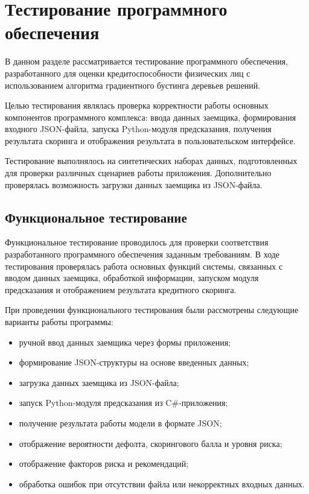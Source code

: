 \section{Тестирование программного обеспечения}

В данном разделе рассматривается тестирование программного обеспечения, разработанного для оценки кредитоспособности физических лиц с использованием алгоритма градиентного бустинга деревьев решений.

Целью тестирования являлась проверка корректности работы основных компонентов программного комплекса: ввода данных заемщика, формирования входного JSON-файла, запуска Python-модуля предсказания, получения результата скоринга и отображения результата в пользовательском интерфейсе.

Тестирование выполнялось на синтетических наборах данных, подготовленных для проверки различных сценариев работы приложения. Дополнительно проверялась возможность загрузки данных заемщика из JSON-файла.

\subsection{Функциональное тестирование}

Функциональное тестирование проводилось для проверки соответствия разработанного программного обеспечения заданным требованиям. В ходе тестирования проверялась работа основных функций системы, связанных с вводом данных заемщика, обработкой информации, запуском модуля предсказания и отображением результата кредитного скоринга.

При проведении функционального тестирования были рассмотрены следующие варианты работы программы:

\begin{itemize}
  \item ручной ввод данных заемщика через формы приложения;
  \item формирование JSON-структуры на основе введенных данных;
  \item загрузка данных заемщика из JSON-файла;
  \item запуск Python-модуля предсказания из C\#-приложения;
  \item получение результата работы модели в формате JSON;
  \item отображение вероятности дефолта, скорингового балла и уровня риска;
  \item отображение факторов риска и рекомендаций;
  \item обработка ошибок при отсутствии файла или некорректных входных данных.
\end{itemize}

